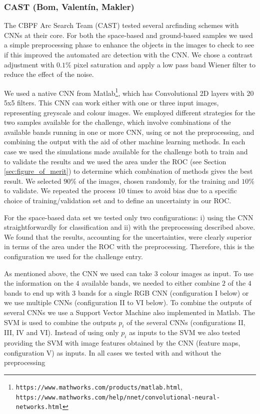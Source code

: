 \documentclass{aa}
\begin{document}
\subsubsection{CAST (Bom, Valent\'in, Makler)}
\label{sec:CAST}

The CBPF Arc Search Team (CAST) tested several arcfinding schemes with CNNs at their core.  
For both the space-based and ground-based samples we used a simple preprocessing phase to enhance the objects in the images to check to 
see if this improved the automated arc detection with the CNN. We chose a contrast adjustment with $0.1\%$ pixel saturation and apply a low pass band Wiener filter \citep{wiener1964extrapolation} to reduce the effect of the noise. 

We used a native CNN from Matlab\footnote{\texttt{https://www.mathworks.com/products/matlab.html}, \texttt{https://www.mathworks.com/help/nnet/convolutional-neural-networks.html}}, which has Convolutional 2D layers with 20 5x5 filters. This CNN can work either with one or three input images, representing greyscale and colour images.
We employed different strategies for the two samples available for the challenge, which involve combinations of the available bands running in one or more CNN, using or not the preprocessing, and combining the output with the aid of other machine learning methods.
In each case we used the simulations made available for the challenge both to train and to validate the results and we used the area under the ROC (see Section \ref{sec:figure_of_merit}) to determine which combination of methods gives the best result.    
We selected 
$90\%$ of the images, chosen randomly, for the training and $10\%$ to validate. We repeated the process $10$ times to avoid bias due to a specific choice of training/validation set and to define an uncertainty in our ROC.

For the space-based data set we tested only two configurations: i) using the CNN straightforwardly for classification and ii) 
with the preprocessing described above. 
We found that the results, accounting for the uncertainties,  
were clearly superior in terms of the area under the ROC with the preprocessing. Therefore, this is the configuration we used for the challenge entry. 

As mentioned above, the CNN we used can take 3 colour images as input.  To use the information on the $4$ available bands, we needed to either combine $2$ of the $4$ bands to end up with $3$ bands for a single RGB CNN (configuration I below) or we use multiple CNNs (configuration II to VI below). To combine the outputs of several CNNs we use a Support Vector Machine \citep[ SVM; see e.g. ][]{rebentrost2014quantum} also implemented in Matlab. The SVM is used to combine the outputs $p_i$ of the several CNNs (configurations II, III, IV and VI). Instead of using only $p_i$ as inputs to the SVM we also tested providing the SVM with image features obtained by the CNN (feature maps, configuration V) as inputs. In all cases we tested with and without the preprocessing
\end{document}
